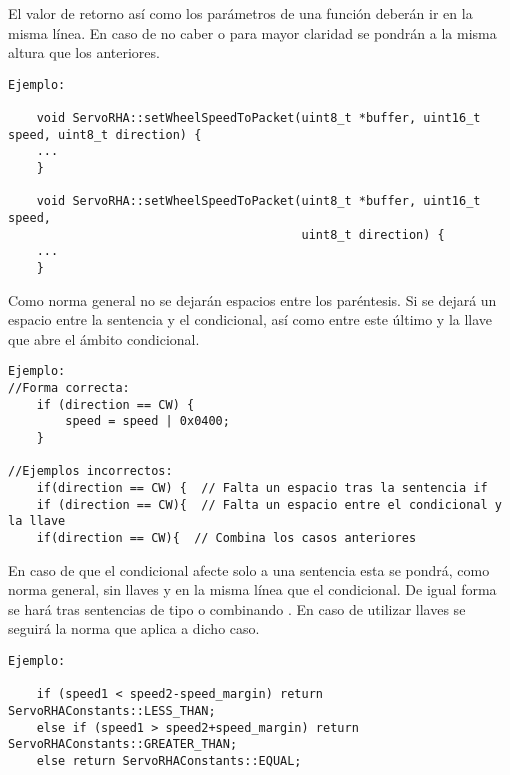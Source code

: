 El valor de retorno así como los parámetros de una función deberán ir en la misma línea. En caso de no caber o para mayor claridad se pondrán a la misma altura que los anteriores.
\\ 

    \lstset{language=C, breaklines=true, basicstyle=\footnotesize}
    \begin{lstlisting}[frame=single]
Ejemplo: 

    void ServoRHA::setWheelSpeedToPacket(uint8_t *buffer, uint16_t speed, uint8_t direction) {
	...
    }

    void ServoRHA::setWheelSpeedToPacket(uint8_t *buffer, uint16_t speed,
                                         uint8_t direction) {
	...
    }

    \end{lstlisting}
    
    

Como norma general no se dejarán espacios entre los paréntesis. Si se dejará un espacio entre la sentencia  y el condicional, así como entre este último y la llave que abre el ámbito condicional.
\\ 

    \lstset{language=C, breaklines=true, basicstyle=\footnotesize}
    \begin{lstlisting}[frame=single]
Ejemplo: 
//Forma correcta:
    if (direction == CW) {
        speed = speed | 0x0400;
    }
    
//Ejemplos incorrectos:
    if(direction == CW) {  // Falta un espacio tras la sentencia if
    if (direction == CW){  // Falta un espacio entre el condicional y la llave
    if(direction == CW){  // Combina los casos anteriores 

    \end{lstlisting}
    
    En caso de que el condicional afecte solo a una sentencia esta se pondrá, como norma general, sin llaves y en la misma línea que el condicional. De igual forma se hará tras sentencias de tipo  o combinando . En caso de utilizar llaves se seguirá la norma que aplica a dicho caso.
\\ 

    \lstset{language=C, breaklines=true, basicstyle=\footnotesize}
    \begin{lstlisting}[frame=single]
Ejemplo: 

    if (speed1 < speed2-speed_margin) return ServoRHAConstants::LESS_THAN;
    else if (speed1 > speed2+speed_margin) return ServoRHAConstants::GREATER_THAN;
    else return ServoRHAConstants::EQUAL;

    \end{lstlisting}
    
